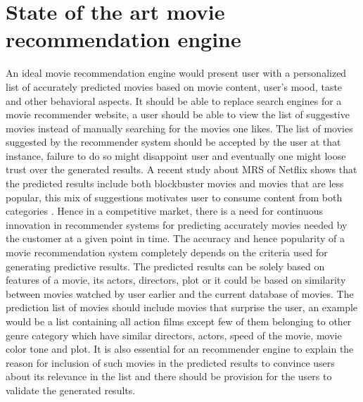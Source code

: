 \section{State of the art movie recommendation engine}
\label{State of the art movie recommendation engine}
An ideal movie recommendation engine would present user with a personalized list of accurately predicted movies based on movie content, user's mood, taste and other behavioral aspects. It should be able to replace search engines for a movie recommender website, a user should be able to view the list of suggestive movies instead of manually searching for the movies one likes. The list of movies suggested by the recommender system should be accepted by the user at that instance, failure to do so might disappoint user and eventually one might loose trust over the generated results. A recent study about \acrshort{MRS} of Netflix shows that the predicted results include both blockbuster movies and movies that are less popular, this mix of suggestions motivates user to consume content from both categories \citep{Longtail_online}. Hence in a competitive market, there is a need for continuous innovation in recommender systems for predicting accurately movies needed by the customer at a given point in time. The accuracy and hence popularity of a movie recommendation system completely depends on the criteria used for generating predictive results. The predicted results can be solely based on features of a movie, its actors, directors, plot or it could be based on similarity between movies watched by user earlier and the current database of movies. The prediction list of movies should include movies that surprise the user, an example would be a list containing all action films except few of them belonging to other genre category which have similar directors, actors, speed of the movie, movie color tone and plot. It is also essential for an recommender engine to explain the reason for inclusion of such movies in the predicted results to convince users about its relevance in the list and there should be provision for the users to validate the generated results.  

